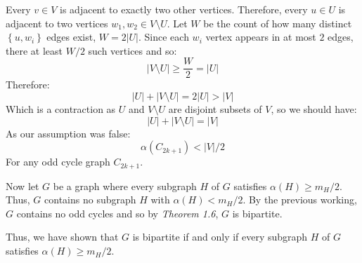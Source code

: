 \documentclass[a4paper, 11pt]{article}
\def\set#1{\left\{ #1 \right\}}
\begin{document}
\begin{multicols*}{2}
\begin{mdframed}
		Every $v\in V$ is adjacent to exactly two other vertices. Therefore, every $u\in U$ is adjacent to two vertices $w_1,w_2\in V\setminus U$. Let $W$ be the count of how many distinct $\set{u,w_i}$ edges exist, $W=2|U|$. Since each $w_i$ vertex appears in at most $2$ edges, there at least $W/2$ such vertices and so:
		$$|V\setminus U|\geq \frac W2 = |U|$$
		Therefore:
		$$|U|+|V\setminus U|=2|U|>|V|$$
		Which is a contraction as $U$ and $V\setminus U$ are disjoint subsets of $V$, so we should have:
		$$|U|+|V\setminus U|=|V|$$
		As our assumption was false:
		$$\alpha(C_{2k+1})<|V|/2$$
		For any odd cycle graph $C_{2k+1}$.

		Now let $G$ be a graph where every subgraph $H$ of $G$ satisfies $\alpha(H)\geq m_H/2$. Thus, $G$ contains no subgraph $H$ with $\alpha(H)< m_H/2$. By the previous working, $G$ contains no odd cycles and so by \textit{Theorem 1.6}, $G$ is bipartite.
	\end{mdframed}

	Thus, we have shown that $G$ is bipartite if and only if every subgraph $H$ of $G$ satisfies $\alpha(H)\geq m_H/2$.

	\vfill
	\pagebreak
\end{multicols*}
\end{document}
